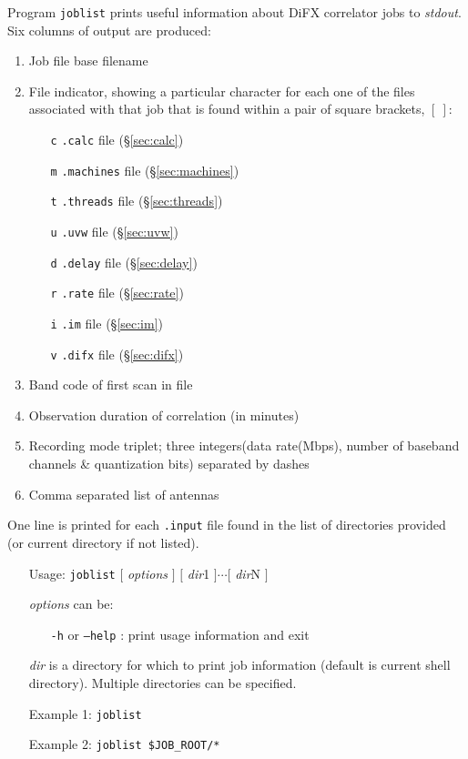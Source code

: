 Program {\tt joblist} prints useful information about DiFX correlator jobs to {\em stdout}.
Six columns of output are produced:
\begin{enumerate}
\item Job file base filename
\item File indicator, showing a particular character for each one of the files associated with that job that is found within a pair of square brackets, $[\ ]$:
\begin{itemize}
\item[{\tt c}] {\tt .calc} file (\S\ref{sec:calc})
\item[{\tt m}] {\tt .machines} file (\S\ref{sec:machines})
\item[{\tt t}] {\tt .threads} file (\S\ref{sec:threads})
\item[{\tt u}] {\tt .uvw} file (\S\ref{sec:uvw})
\item[{\tt d}] {\tt .delay} file (\S\ref{sec:delay})
\item[{\tt r}] {\tt .rate} file (\S\ref{sec:rate})
\item[{\tt i}] {\tt .im} file (\S\ref{sec:im})
\item[{\tt v}] {\tt .difx} file (\S\ref{sec:difx})
\end{itemize}
\item Band code of first scan in file
\item Observation duration of correlation (in minutes)
\item Recording mode triplet; three integers(data rate(Mbps), number of baseband channels \& quantization bits) separated by dashes
\item Comma separated list of antennas
\end{enumerate}
One line is printed for each {\tt .input} file found in the list of directories provided (or current directory if not listed).

\begin{itemize}
\item[] Usage: {\tt joblist} $[$ {\em options} $]$ $[$ {\em dir}1 $] \cdots [$ {\em dir}N $]$
\item[] {\em options} can be:
\begin{itemize}
\item[] {\tt -h} or {\tt --help} : print usage information and exit
\end{itemize}
\item[] {\em dir} is a directory for which to print job information (default is current shell directory).
Multiple directories can be specified.
\item[] Example 1: {\tt joblist}
\item[] Example 2: {\tt joblist \$JOB\_ROOT/*}
\end{itemize}


